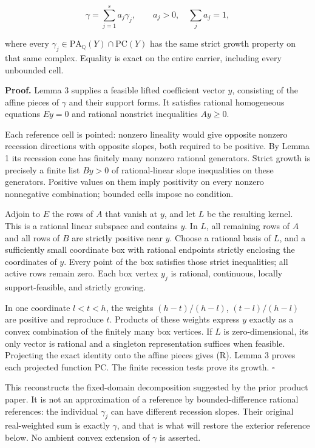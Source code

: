 \documentclass[
  10pt,
]{article}
\begin{document}
\[
\gamma=\sum_{j=1}^s a_j\gamma_j,\qquad a_j>0,\quad\sum_j a_j=1, \tag{R}
\]

where every \(\gamma_j\in\mathrm{PA}_{\mathbb Q}(Y)\cap\mathrm{PC}(Y)\)
has the same strict growth property on that same complex. Equality is
exact on the entire carrier, including every unbounded cell.

\textbf{Proof.} Lemma 3 supplies a feasible lifted coefficient vector
\(y\), consisting of the affine pieces of \(\gamma\) and their support
forms. It satisfies rational homogeneous equations \(Ey=0\) and rational
nonstrict inequalities \(Ay\geq0\).

Each reference cell is pointed: nonzero lineality would give opposite
nonzero recession directions with opposite slopes, both required to be
positive. By Lemma 1 its recession cone has finitely many nonzero
rational generators. Strict growth is precisely a finite list \(By>0\)
of rational-linear slope inequalities on these generators. Positive
values on them imply positivity on every nonzero nonnegative
combination; bounded cells impose no condition.

Adjoin to \(E\) the rows of \(A\) that vanish at \(y\), and let \(L\) be
the resulting kernel. This is a rational linear subspace and contains
\(y\). In \(L\), all remaining rows of \(A\) and all rows of \(B\) are
strictly positive near \(y\). Choose a rational basis of \(L\), and a
sufficiently small coordinate box with rational endpoints strictly
enclosing the coordinates of \(y\). Every point of the box satisfies
those strict inequalities; all active rows remain zero. Each box vertex
\(y_j\) is rational, continuous, locally support-feasible, and strictly
growing.

In one coordinate \(l<t<h\), the weights \((h-t)/(h-l)\),
\((t-l)/(h-l)\) are positive and reproduce \(t\). Products of these
weights express \(y\) exactly as a convex combination of the finitely
many box vertices. If \(L\) is zero-dimensional, its only vector is
rational and a singleton representation suffices when feasible.
Projecting the exact identity onto the affine pieces gives (R). Lemma 3
proves each projected function PC. The finite recession tests prove its
growth. \(\square\)

This reconstructs the fixed-domain decomposition suggested by the prior
product paper. It is not an approximation of a reference by
bounded-difference rational references: the individual \(\gamma_j\) can
have different recession slopes. Their original real-weighted sum is
exactly \(\gamma\), and that is what will restore the exterior reference
below. No ambient convex extension of \(\gamma\) is asserted.
\end{document}
